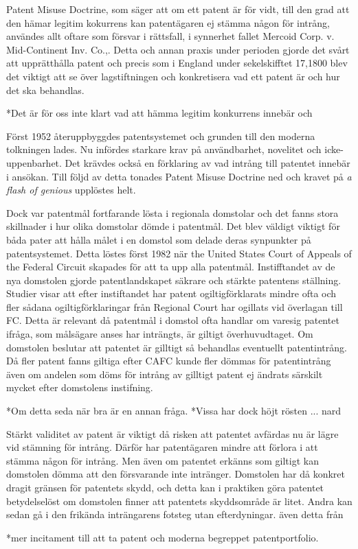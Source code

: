 Patent Misuse Doctrine, som säger att om ett patent är för vidt, till den grad att den hämar legitim
kokurrens kan patentägaren ej stämma någon för intrång, användes allt oftare som försvar i rättsfall, i
synnerhet fallet Mercoid Corp. v. Mid-Continent Inv. Co.,\cite{nard}. Detta och annan praxis under
perioden gjorde det svårt att upprätthålla patent och precis som i England under sekelskifftet 17,1800
blev det viktigt att se över lagstiftningen och konkretisera vad ett patent är och hur det ska behandlas.

*Det är för oss inte klart vad att hämma legitim konkurrens innebär och 

Först 1952 återuppbyggdes patentsystemet och grunden till den moderna tolkningen lades. Nu infördes
starkare krav på användbarhet, novelitet och icke-uppenbarhet. Det krävdes också en förklaring av vad
intrång till patentet innebär i ansökan. Till följd av detta tonades Patent Misuse Doctrine ned och
kravet på \emph{a flash of genious} upplöstes helt\cite{nard}.

Dock var patentmål fortfarande lösta i regionala domstolar och det fanns stora skillnader i hur olika
domstolar dömde i patentmål\cite{nard}. Det blev väldigt viktigt för båda pater att hålla målet i en
domstol som delade deras synpunkter på patentsystemet. Detta löstes först 1982 när the United States
Court of Appeals of the Federal Circuit skapades för att ta upp alla patentmål\cite{nard}. Instifftandet
av de nya domstolen gjorde patentlandskapet säkrare och stärkte patentens ställning. Studier visar att
efter instiftandet har patent ogiltigförklarats mindre ofta och fler sådana ogiltigförklaringar från
Regional Court har ogillats vid överlagan till FC. \cite{henry} Detta är relevant då patentmål i domstol
ofta handlar om varesig patentet ifråga, som målsägare anses har inträngts, är giltigt överhuvudtaget.
Om domstolen beslutar att patentet är gilltigt så behandlas eventuellt patentintrång. Då fler patent
fanns giltiga efter CAFC kunde fler dömmas för patentintrång även om andelen som döms för intrång av
gilltigt patent ej ändrats särskilt mycket efter domstolens instifning. 

*Om detta seda när bra är en annan fråga. 
*Vissa har dock höjt rösten ... nard

Stärkt validitet av patent är viktigt då risken att patentet avfärdas nu är lägre vid stämning för
intrång. Därför har patentägaren mindre att förlora i att stämma någon för intrång. Men
även om patentet erkänns som giltigt kan domstolen dömma att den försvarande inte intränger.
Domstolen har då konkret dragit gränsen för patentets skydd, och detta kan i praktiken göra patentet
betydelselöst om domstolen finner att patentets skyddsområde är litet. Andra kan sedan gå i den frikända
inträngarens fotsteg utan efterdyningar. även detta från \cite{henry}

*mer incitament till att ta patent och moderna begreppet patentportfolio. 

